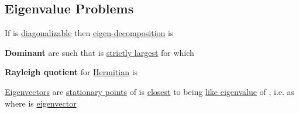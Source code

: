 \subsection*{Eigenvalue Problems}

If  is \ul{diagonalizable} then \ul{eigen-decomposition} is 

\begin{itemize}

      \vItem
            \textbf{Dominant}  are such that
             is \ul{strictly largest} for which

            \tcbbreak
      \vItem
            \textbf{Rayleigh quotient} for \ul{Hermitian}  is

            \begin{itemize}

                  \vItem
                        \ul{Eigenvectors} are \ul{stationary points} of 
                  \vItem
                         is \ul{closest} to being \ul{like eigenvalue}
                        of , i.e. 
                  \vItem
                        as  where \iMbox{\nu} is \ul{eigenvector}
            \end{itemize}
\end{itemize}

\hSep %

